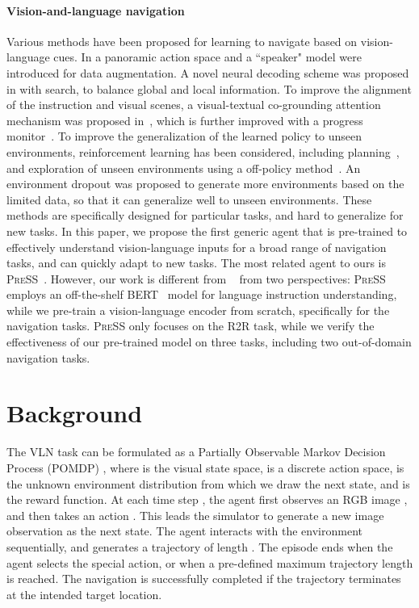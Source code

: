 \documentclass[10pt,twocolumn,letterpaper]{article}
\begin{document}
\paragraph{Vision-and-language navigation} Various methods have been proposed for learning to navigate based on vision-language cues. In \cite{fried2018speaker} a panoramic action space and a ``speaker" model were introduced for data augmentation. 
A novel neural decoding scheme was proposed in \cite{ke2019tactical} with search, to balance global and local information. 
To improve the alignment of the instruction and visual scenes, a visual-textual co-grounding attention mechanism was proposed in~\cite{ma2019self}, which is further improved with a progress monitor~\cite{ma2019regretful}. To improve the generalization of the learned policy to unseen environments, reinforcement learning has been considered, including planning~\cite{wang2018look}, and exploration of unseen environments using a off-policy method~\cite{wang2018reinforced}. An environment dropout was proposed \cite{tan2019learning} to generate more environments based on the limited data, so that it can generalize well to unseen environments. These methods are specifically designed for particular tasks, and hard to generalize for new tasks. In this paper, we propose the first generic agent that is pre-trained to effectively understand vision-language inputs for a broad range of navigation tasks, and can quickly adapt to new tasks. The most related agent to ours is \textsc{PreSS}~\cite{li2019robust}. However, our work is different from ~\cite{li2019robust} from two perspectives: 
 \textsc{PreSS} employs an off-the-shelf BERT~\cite{devlin2018bert} model for language instruction understanding, while we pre-train a vision-language encoder from scratch, specifically for the navigation tasks.
 \textsc{PreSS} only focuses on the R2R task, while we verify the effectiveness of our pre-trained model on three tasks, including two out-of-domain navigation tasks.


\vspace{-1mm}
\section{Background}
The VLN task can be formulated as a Partially Observable Markov Decision Process (POMDP) , where  is the visual state space,  is a discrete action space,  is the unknown environment distribution from which we draw the next state, and  is the reward function. At each time step , the agent first observes an RGB image , and then takes an action . This leads the simulator to generate a new image observation  as the next state. 
The agent interacts with the environment sequentially, and generates a trajectory of length . 
The episode ends when the agent selects the special  action, or when a pre-defined maximum trajectory length is reached. The navigation is successfully completed if the trajectory  terminates at the intended target location. 
\end{document}
